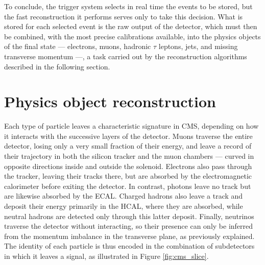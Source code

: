 \noindent To conclude, the trigger system selects in real time the events to be stored, but the fast reconstruction it performs serves only to take this decision. What is stored for each selected event is the raw output of the detector, which must then be combined, with the most precise calibrations available, into the physics objects of the final state — electrons, muons, hadronic $\tau$ leptons, jets, and missing transverse momentum —, a task carried out by the reconstruction algorithms described in the following section.



\section{Physics object reconstruction}
\label{sec:POR}
%
Each type of particle leaves a characteristic signature in CMS, depending on how it interacts with the successive layers of the detector. Muons traverse the entire detector, losing only a very small fraction of their energy, and leave a record of their trajectory in both the silicon tracker and the muon chambers — curved in opposite directions inside and outside the solenoid. Electrons also pass through the tracker, leaving their tracks there, but are absorbed by the electromagnetic calorimeter before exiting the detector. In contrast, photons leave no track but are likewise absorbed by the ECAL. Charged hadrons also leave a track and deposit their energy primarily in the HCAL, where they are absorbed, while neutral hadrons are detected only through this latter deposit. Finally, neutrinos traverse the detector without interacting, so their presence can only be inferred from the momentum imbalance in the transverse plane, as previously explained. The identity of each particle is thus encoded in the combination of subdetectors in which it leaves a signal, as illustrated in Figure \ref{fig:cms_slice}.

